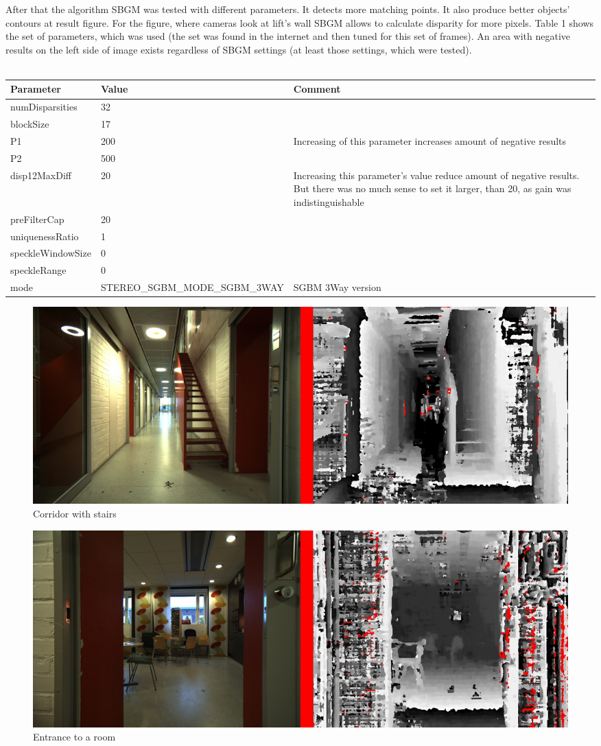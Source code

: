 \documentclass{article}
\begin{document}
After that the algorithm SBGM was tested with different parameters. It detects more matching points. It also produce better objects' contours at result figure. For the figure, where cameras look at lift's wall SBGM allows to calculate disparity for more pixels. Table 1 shows the set of parameters, which was used (the set was found in the internet and then tuned for this set of frames). An area with negative results on the left side of image exists regardless of SBGM settings (at least those settings, which were tested).
\\
\\
\begin{tabular}{| p{3cm} | p{7cm} | p{3cm} |}
\hline
Parameter & Value & Comment \\
\hline
numDisparsities & 32 & \\
\hline
blockSize & 17 & \\
\hline
P1 & 200 & Increasing of this parameter increases amount of negative results\\
\hline
P2 & 500 & \\
\hline
disp12MaxDiff & 20 & Increasing this parameter's value reduce amount of negative results. But there was no much sense to set it larger, than 20, as gain was indistinguishable\\
\hline
preFilterCap & 20 & \\
\hline
uniquenessRatio & 1 & \\
\hline
speckleWindowSize & 0 & \\
\hline
speckleRange & 0 & \\
\hline
mode & STEREO\_SGBM\_MODE\_SGBM\_3WAY & SGBM 3Way version \\
\hline
\end{tabular}

\begin{figure}[H]
	\includegraphics[width=\textwidth]{sbgm1}
	\caption{Corridor with stairs}
\end{figure}

\begin{figure}[H]
	\includegraphics[width=\textwidth]{sbgm2}
	\caption{Entrance to a room}
\end{figure}
\end{document}
